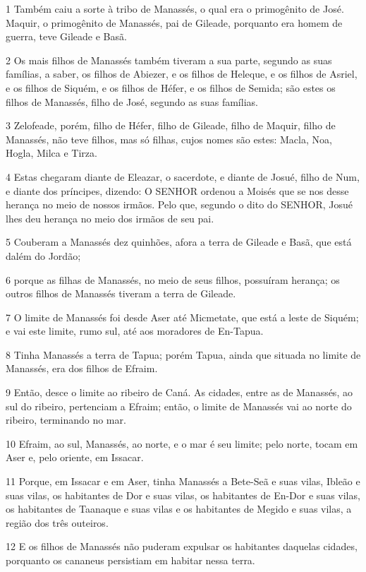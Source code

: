 \par 1 Também caiu a sorte à tribo de Manassés, o qual era o primogênito de José. Maquir, o primogênito de Manassés, pai de Gileade, porquanto era homem de guerra, teve Gileade e Basã.
\par 2 Os mais filhos de Manassés também tiveram a sua parte, segundo as suas famílias, a saber, os filhos de Abiezer, e os filhos de Heleque, e os filhos de Asriel, e os filhos de Siquém, e os filhos de Héfer, e os filhos de Semida; são estes os filhos de Manassés, filho de José, segundo as suas famílias.
\par 3 Zelofeade, porém, filho de Héfer, filho de Gileade, filho de Maquir, filho de Manassés, não teve filhos, mas só filhas, cujos nomes são estes: Macla, Noa, Hogla, Milca e Tirza.
\par 4 Estas chegaram diante de Eleazar, o sacerdote, e diante de Josué, filho de Num, e diante dos príncipes, dizendo: O SENHOR ordenou a Moisés que se nos desse herança no meio de nossos irmãos. Pelo que, segundo o dito do SENHOR, Josué lhes deu herança no meio dos irmãos de seu pai.
\par 5 Couberam a Manassés dez quinhões, afora a terra de Gileade e Basã, que está dalém do Jordão;
\par 6 porque as filhas de Manassés, no meio de seus filhos, possuíram herança; os outros filhos de Manassés tiveram a terra de Gileade.
\par 7 O limite de Manassés foi desde Aser até Micmetate, que está a leste de Siquém; e vai este limite, rumo sul, até aos moradores de En-Tapua.
\par 8 Tinha Manassés a terra de Tapua; porém Tapua, ainda que situada no limite de Manassés, era dos filhos de Efraim.
\par 9 Então, desce o limite ao ribeiro de Caná. As cidades, entre as de Manassés, ao sul do ribeiro, pertenciam a Efraim; então, o limite de Manassés vai ao norte do ribeiro, terminando no mar.
\par 10 Efraim, ao sul, Manassés, ao norte, e o mar é seu limite; pelo norte, tocam em Aser e, pelo oriente, em Issacar.
\par 11 Porque, em Issacar e em Aser, tinha Manassés a Bete-Seã e suas vilas, Ibleão e suas vilas, os habitantes de Dor e suas vilas, os habitantes de En-Dor e suas vilas, os habitantes de Taanaque e suas vilas e os habitantes de Megido e suas vilas, a região dos três outeiros.
\par 12 E os filhos de Manassés não puderam expulsar os habitantes daquelas cidades, porquanto os cananeus persistiam em habitar nessa terra.

